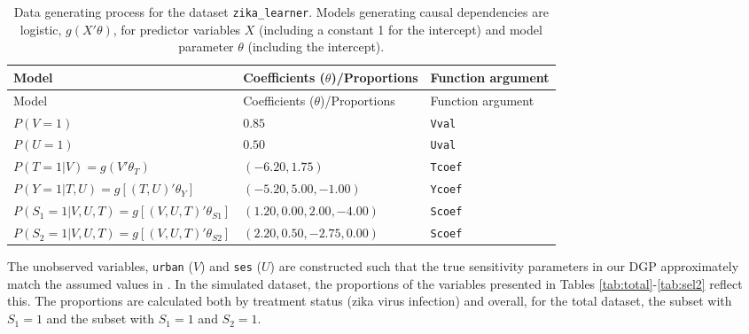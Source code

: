 \begin{longtable}[]{@{}
  >{\centering\arraybackslash}p{}
  >{\centering\arraybackslash}p{}
  >{\raggedleft\arraybackslash}p{}@{}}
\caption{\label{tab:dgp} Data generating process for the dataset \protect\texttt{zika\_learner}. Models
generating causal dependencies are logistic, \(g(X'\theta)\), for predictor
variables \(X\) (including a constant 1 for the intercept) and model parameter
\(\theta\) (including the intercept).}\tabularnewline
\toprule\noalign{}
\begin{minipage}[b]{\linewidth}\centering
Model
\end{minipage} & \begin{minipage}[b]{\linewidth}\centering
Coefficients (\(\theta\))/Proportions
\end{minipage} & \begin{minipage}[b]{\linewidth}\raggedleft
Function argument
\end{minipage} \\
\midrule\noalign{}
\endfirsthead
\toprule\noalign{}
\begin{minipage}[b]{\linewidth}\centering
Model
\end{minipage} & \begin{minipage}[b]{\linewidth}\centering
Coefficients (\(\theta\))/Proportions
\end{minipage} & \begin{minipage}[b]{\linewidth}\raggedleft
Function argument
\end{minipage} \\
\midrule\noalign{}
\endhead
\bottomrule\noalign{}
\endlastfoot
\(P(V=1)\) & \(0.85\) & \texttt{Vval} \\
\(P(U=1)\) & \(0.50\) & \texttt{Uval} \\
\(P(T=1|V)=g(V'\theta_T)\) & \((-6.20,1.75)\) & \texttt{Tcoef} \\
\(P(Y=1|T,U)=g[(T,U)'\theta_{Y}]\) & \((-5.20,5.00,-1.00)\) & \texttt{Ycoef} \\
\(P(S_1=1|V,U,T)=g[(V,U,T)'\theta_{S1}]\) & \((1.20,0.00,2.00,-4.00)\) & \texttt{Scoef} \\
\(P(S_2=1|V,U,T)=g[(V,U,T)'\theta_{S2}]\) & \((2.20,0.50,-2.75,0.00)\) & \texttt{Scoef} \\
\end{longtable}

The unobserved variables, \texttt{urban} (\(V\)) and \texttt{ses} (\(U\)) are constructed such
that the true sensitivity parameters in our DGP approximately match the assumed
values in \citet{smith2019bounding}. In the simulated dataset, the proportions of the
variables presented in Tables \ref{tab:total}-\ref{tab:sel2} reflect this. The proportions are calculated both by treatment status
(zika virus infection) and overall, for the total dataset, the
subset with \(S_1=1\) and the subset with \(S_1=1\) and \(S_2=1\).

